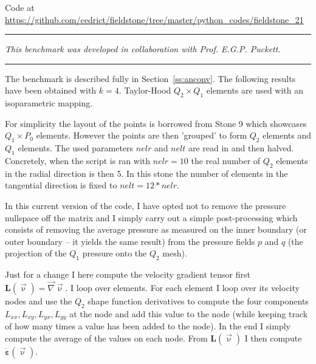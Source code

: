 


\begin{center}
Code at \url{https://github.com/cedrict/fieldstone/tree/master/python_codes/fieldstone_21}
\end{center}

\par\noindent\rule{\textwidth}{0.4pt}

{\sl This benchmark was developed in collaboration with Prof. E.G.P. Puckett}. 

\par\noindent\rule{\textwidth}{0.4pt}

The benchmark is described fully in Section~\ref{ss:anconv}. 
The following results have been obtained with $k=4$.
Taylor-Hood $Q_2\times Q_1$ elements are used with an isoparametric mapping. 

For simplicity the layout of the points is borrowed from Stone 9 which 
showcases $Q_1 \times P_0$ elements. However the points are then 'grouped' 
to form $Q_2$ elements and $Q_1$ elements. 
The used parameters $nelr$ and $nelt$ are read in and then halved. Concretely, 
when the script is ran with $nelr=10$ the real number of $Q_2$ elements 
in the radial direction is then 5. In this stone the number of elements
in the tangential direction is fixed to $nelt=12*nelr$.

In this current version of the code, I have opted not to remove the pressure nullspace
off the matrix and I simply carry out a simple post-processing which consists of 
removing the average pressure as measured on the inner boundary (or outer boundary -- it 
yields the same result) from the pressure fields $p$ and $q$ (the projection of the 
$Q_1$ pressure onto the $Q_2$ mesh). 

Just for a change I here compute the velocity gradient tensor first ${\bm L}(\vec\upnu)=\vec\nabla\vec\upnu$.
I loop over elements. For each element I loop over its velocity nodes and use the $Q_2$ 
shape function derivatives to compute the four components $L_{xx},L_{xy},L_{yx},L_{yy}$ at 
the node and add this value to the node (while keeping track of how many times a value
has been added to the node). In the end I simply compute the average of the values
on each node. From ${\bm L}(\vec\upnu)$ I then compute $\dot{\bm \varepsilon}(\vec\upnu)$. 

